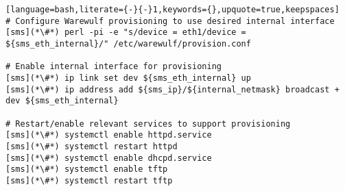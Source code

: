
\begin{lstlisting}[language=bash,literate={-}{-}1,keywords={},upquote=true,keepspaces]
# Configure Warewulf provisioning to use desired internal interface
[sms](*\#*) perl -pi -e "s/device = eth1/device = ${sms_eth_internal}/" /etc/warewulf/provision.conf

# Enable internal interface for provisioning
[sms](*\#*) ip link set dev ${sms_eth_internal} up
[sms](*\#*) ip address add ${sms_ip}/${internal_netmask} broadcast + dev ${sms_eth_internal}

# Restart/enable relevant services to support provisioning
[sms](*\#*) systemctl enable httpd.service
[sms](*\#*) systemctl restart httpd
[sms](*\#*) systemctl enable dhcpd.service
[sms](*\#*) systemctl enable tftp
[sms](*\#*) systemctl restart tftp
\end{lstlisting}
